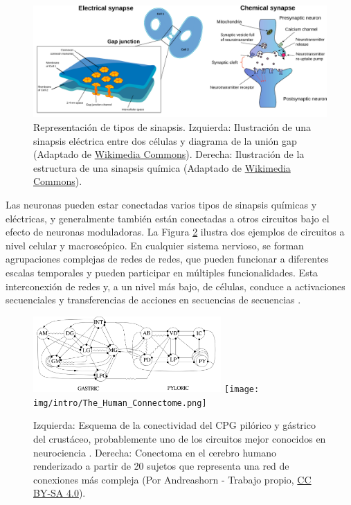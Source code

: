 \begin{figure}[hbt!]
	\centering
	\includegraphics[width=\linewidth]{img/intro/synapses.pdf}
	\caption{Representación de tipos de sinapsis. Izquierda: Ilustración de una sinapsis eléctrica entre dos células y diagrama de la unión gap (Adaptado de \href{https://commons.wikimedia.org/wiki/File:Gap_cell_junction-en.svg}{Wikimedia Commons}). Derecha: Ilustración de la estructura de una sinapsis química (Adaptado de \href{https://commons.wikimedia.org/wiki/File:Synapse_diag1.svg}{Wikimedia Commons}).}
	\label{fig:synapse-types spanish}
\end{figure}

Las neuronas pueden estar conectadas varios tipos de sinapsis químicas y eléctricas, y generalmente también están conectadas a otros circuitos bajo el efecto de neuronas moduladoras. La Figura \ref{fig:neural circuits spanish} ilustra dos ejemplos de circuitos a nivel celular y macroscópico. En cualquier sistema nervioso, se forman agrupaciones complejas de redes de redes, que pueden funcionar a diferentes escalas temporales y pueden participar en múltiples funcionalidades. Esta interconexión de redes y, a un nivel más bajo, de células, conduce a activaciones secuenciales y transferencias de acciones en secuencias de secuencias \parencite{rabinovich_sequential_2020}.

\begin{figure}[hbt!]
	\centering
	\includegraphics[width=0.64\textwidth]{img/intro/cpg diagram.png}
	\texttt{[image: img/intro/The\_Human\_Connectome.png]}
	\caption{Izquierda: Esquema de la conectividad del CPG pilórico y gástrico del crustáceo, probablemente uno de los circuitos mejor conocidos en neurociencia \parencite{huerta_topology_2001}. Derecha: Conectoma en el cerebro humano renderizado a partir de 20 sujetos que representa una red de conexiones más compleja (Por Andreashorn - Trabajo propio, \href{https://commons.wikimedia.org/w/index.php?curid=41581320}{CC BY-SA 4.0}).}
	\label{fig:neural circuits spanish}
\end{figure}

